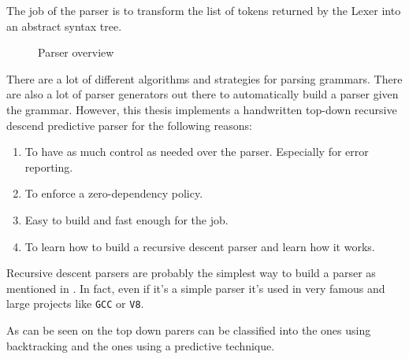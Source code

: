 The job of the parser is to transform the list of tokens returned by the Lexer into an abstract syntax tree.\\

\begin{figure}[H]
    \centering

    \caption{Parser overview}
    \label{fig:parser_overview}
\end{figure}

There are a lot of different algorithms and strategies for parsing grammars.
There are also a lot of parser generators out there to automatically build a parser given the grammar. However, this thesis implements
a handwritten top-down recursive descend predictive parser for the following reasons:

\begin{enumerate}
    \item To have as much control as needed over the parser. Especially for error reporting.
    \item To enforce a zero-dependency policy.
    \item Easy to build and fast enough for the job.
    \item To learn how to build a recursive descent parser and learn how it works.
\end{enumerate}

Recursive descent parsers are probably the simplest way to build a parser as mentioned in \autocite[Section~6]{crafting_interpreters}.
In fact, even if it's a simple parser it's used in very famous and large projects like \texttt{GCC} or \texttt{V8}.

As can be seen on \autocite{top_down_parsing} the top down parers can be classified into the ones using backtracking and the ones using a predictive technique.

